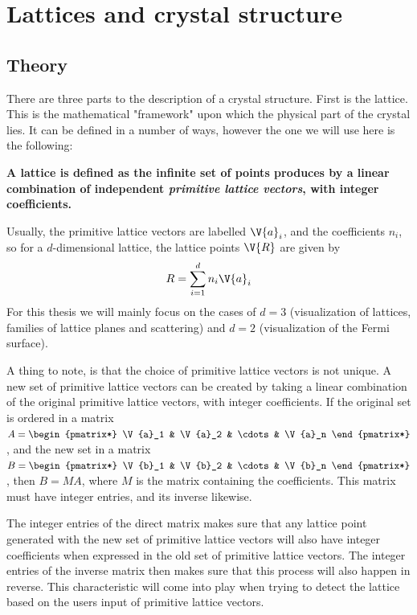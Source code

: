 \documentclass[main.tex]{subfiles}
\begin{document}
	\section{Lattices and crystal structure}
	\subsection{Theory}
	There are three parts to the description of a crystal structure. First is the lattice. This is the mathematical "framework" upon which the physical part of the crystal lies. It can be defined in a number of ways, however the one we will use here is the following:
	
	\textbf{A lattice is defined as the infinite set of points produces by a linear combination of independent \emph{primitive lattice vectors}, with integer coefficients.}
	
	Usually, the primitive lattice vectors are labelled $ \V{a}_i $, and the coefficients $ n_i $, so for a $ d $-dimensional lattice, the lattice points $ \V{R} $ are given by
	\begin{equation}\label{eq:lattice_points}
	R = \sum_{i = 1}^{d} n_i \V{a}_i
	\end{equation}
	For this thesis we will mainly focus on the cases of $ d = 3 $ (visualization of lattices, families of lattice planes and scattering) and $ d = 2 $ (visualization of the Fermi surface).
	
	A thing to note, is that the choice of primitive lattice vectors is not unique. A new set of primitive lattice vectors can be created by taking a linear combination of the original primitive lattice vectors, with integer coefficients. If the original set is ordered in a matrix $ A = \begin{pmatrix*} \V{a}_1 & \V{a}_2 & \cdots & \V{a}_n \end{pmatrix*}$, and the new set in a matrix $ B = \begin{pmatrix*} \V{b}_1 & \V{b}_2 & \cdots & \V{b}_n \end{pmatrix*} $, then $ B = MA $, where $ M $ is the matrix containing the coefficients. This matrix must have integer entries, and its inverse likewise.
	
	The integer entries of the direct matrix makes sure that any lattice point generated with the new set of primitive lattice vectors will also have integer coefficients when expressed in the old set of primitive lattice vectors. The integer entries of the inverse matrix then makes sure that this process will also happen in reverse. This characteristic will come into play when trying to detect the lattice based on the users input of primitive lattice vectors.
	
\end{document}
